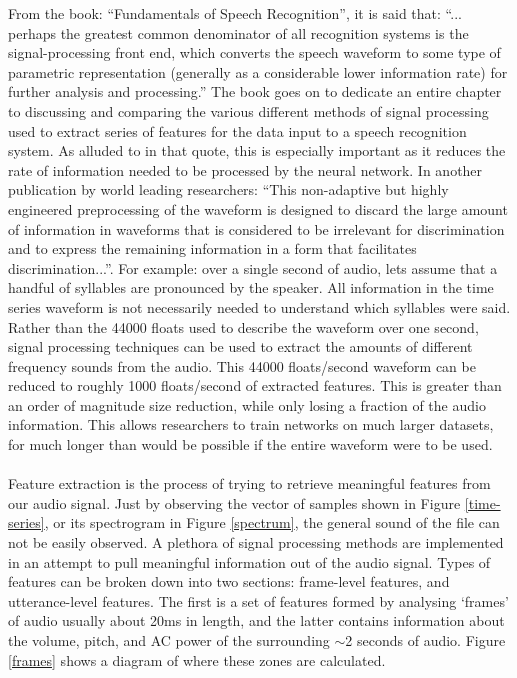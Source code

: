 \documentclass[a4paper,11pt,notitlepage]{article}
\begin{document}
From the book: ``Fundamentals of Speech Recognition'', it is said that: ``... perhaps the greatest common denominator of all recognition systems is the signal-processing front end, which converts the speech waveform to some type of parametric representation (generally as a considerable lower information rate) for further analysis and processing.''\cite{rabiner1993fundamentals} The book goes on to dedicate an entire chapter to discussing and comparing the various different methods of signal processing used to extract series of features for the data input to a speech recognition system. As alluded to in that quote, this is especially important as it reduces the rate of information needed to be processed by the neural network. In another publication by world leading researchers: ``This non-adaptive but highly engineered preprocessing of the waveform is designed to discard the large amount of information in waveforms that is considered to be irrelevant for discrimination and to express the remaining information in a form that facilitates discrimination...''.\cite{hinton2012deep} For example: over a single second of audio, lets assume that a handful of syllables are pronounced by the speaker. All information in the time series waveform is not necessarily needed to understand which syllables were said. Rather than the 44000 floats used to describe the waveform over one second, signal processing techniques can be used to extract the amounts of different frequency sounds from the audio. This 44000 floats/second waveform can be reduced to roughly 1000 floats/second of extracted features. This is greater than an order of magnitude size reduction, while only losing a fraction of the audio information. This allows researchers to train networks on much larger datasets, for much longer than would be possible if the entire waveform were to be used.\\
\\
Feature extraction is the process of trying to retrieve meaningful features from our audio signal. Just by observing the vector of samples shown in Figure \ref{time-series}, or its spectrogram in Figure \ref{spectrum}, the general sound of the file can not be easily observed. A plethora of signal processing methods are implemented in an attempt to pull meaningful information out of the audio signal. Types of features can be broken down into two sections: frame-level features, and utterance-level features. The first is a set of features formed by analysing `frames' of audio usually about 20ms in length, and the latter contains information about the volume, pitch, and AC power of the surrounding $\sim$2 seconds of audio.\cite{truong2007automatic} Figure \ref{frames} shows a diagram of where these zones are calculated.
\end{document}
